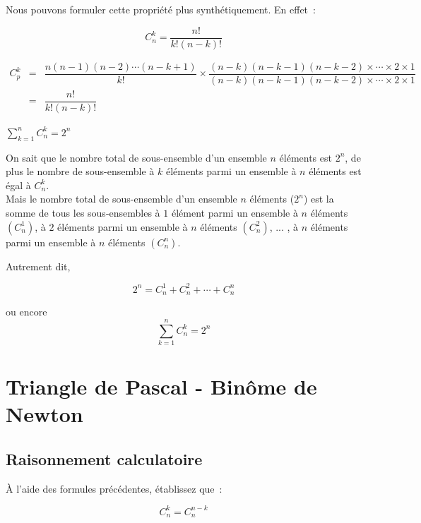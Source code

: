 \documentclass[french]{book}
\newcommand{\co}[2]{C_#2^#1}
\begin{document}
Nous pouvons formuler cette propriété plus synthétiquement. En
effet~:




\begin{thm}[]
   $$\co{k}{n}=\dfrac{n!}{k!(n-k)!}$$
\end{thm}

\begin{demo}
\begin{eqnarray*}
  {\co{k}{p}}&=&\dfrac{n(n-1)(n-2)\cdots(n-k+1)}{k!}\times
\dfrac{(n-k)(n-k-1)(n-k-2)\times\cdots\times 2\times
1}{(n-k)(n-k-1)(n-k-2)\times\cdots\times 2\times
1}\\
&=&\dfrac{n!}{k!(n-k)!}
\end{eqnarray*}
\end{demo}


\begin{prop}
$\sum^n_{k=1} \co{k}{n} =2^n$
\end{prop}

\begin{demo}

On sait que le nombre total de sous-ensemble d'un ensemble $n$ éléments est $2^n$, de plus le nombre de sous-ensemble à $k$ éléments parmi un ensemble à $n$ éléments est égal à $\co{k}{n}$. \\ 

Mais le nombre total de sous-ensemble d'un ensemble $n$ éléments ($2^n$) est la somme de tous les sous-ensembles à $1$ élément parmi un ensemble à $n$ éléments $(\co{1}{n})$, à $2$ éléments parmi un ensemble à $n$ éléments  $(\co{2}{n})$, ... , à $n$ éléments parmi un ensemble à $n$ éléments  $ (\co{n}{n})$. 

Autrement dit, 

$$ 2^n= \co{1}{n} + \co{2}{n} + \cdots +  \co{n}{n} $$

ou encore 
$$\sum^n_{k=1}  \co{k}{n} = 2^n $$
\end{demo}
 \newpage
\section{Triangle de Pascal - Binôme de Newton}

\subsection{Raisonnement calculatoire}

À l'aide des formules précédentes, établissez que~:


\begin{prop}[Symétrie]
$$\co{k}{n}=\co{{n-k}}{n}$$
\end{prop}
\end{document}
